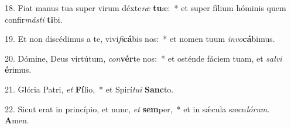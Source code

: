 18. Fiat manus tua super virum déxte\textit{ræ} \textbf{tu}æ:~*  et super fílium hóminis quem confir\textit{más}\textit{ti} \textbf{ti}bi.\

19. Et non discédimus a te, vivi\textit{fi}\textbf{cá}bis nos:~*  et nomen tuum \textit{in}\textit{vo}\textbf{cá}bimus.\

20. Dómine, Deus virtútum, \textit{con}\textbf{vér}te nos:~*  et osténde fáciem tuam, et \textit{sal}\textit{vi} \textbf{é}rimus.\

21. Glória Patri, \textit{et} \textbf{Fí}lio,~*  et Spirí\textit{tu}\textit{i} \textbf{Sanc}to.\

22. Sicut erat in princípio, et nunc, \textit{et} \textbf{sem}per,~*  et in sǽcula sæcu\textit{ló}\textit{rum}. \textbf{A}men.\


